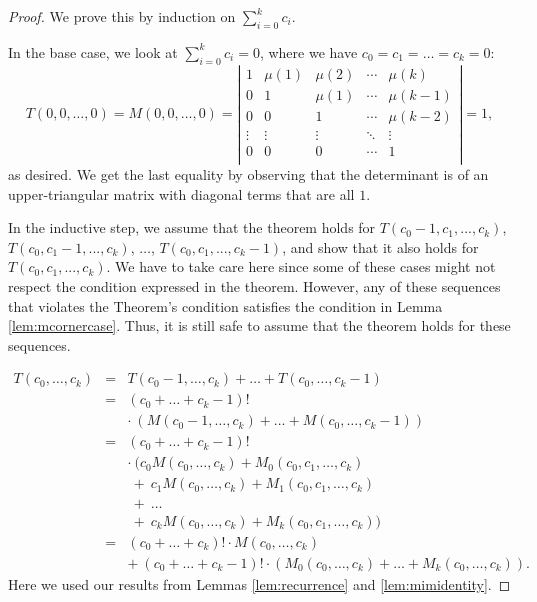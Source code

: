 \documentclass[12pt]{amsart}
\newcommand{\ifact}{\mu}
\newcommand{\M}{M}
\begin{document}
\begin{proof}
We prove this by induction on $\sum_{i=0}^{k}{c_i}$.

In the base case, we look at $\sum_{i=0}^{k}{c_i} = 0$, where we have $c_0 = c_1 = \dots = c_k = 0$:
$$
T(0,0,\dots,0) = \M(0,0,\dots,0)=\left|
\begin{matrix}
1 & \ifact(1) & \ifact(2) & \cdots & \ifact(k) \\
0 & 1 & \ifact(1) & \cdots & \ifact(k-1) \\
0 & 0 & 1 & \cdots & \ifact(k-2) \\
\vdots & \vdots & \vdots & \ddots & \vdots \\
0 & 0 & 0 & \cdots & 1 \\
\end{matrix} \right| = 1,
$$
as desired. We get the last equality by observing that the determinant is of an upper-triangular matrix with diagonal terms that are all $1$.

In the inductive step, we assume that the theorem holds for $T(c_0-1,c_1,...,c_k)$, $T(c_0,c_1-1,...,c_k)$, $\dots$, $T(c_0,c_1,...,c_k-1)$, and show that it also holds for $T(c_0,c_1,...,c_k)$. We have to take care here since some of these cases might not respect the condition expressed in the theorem. However, any of these sequences that violates the Theorem's condition satisfies the condition in Lemma \ref{lem:mcornercase}. Thus, it is still safe to assume that the theorem holds for these sequences.

$$\begin{array}{ccl}
T(c_0, \dots, c_k) & = & T(c_0-1, \dots, c_k) + \dots + T(c_0, \dots, c_k-1) \\
& = & (c_0 + \dots + c_k-1)! \\
& & \cdot\ ( \M(c_0-1, \dots, c_k) + \dots + \M(c_0, \dots, c_k-1)) \\
& = & (c_0 + \dots + c_k-1)! \\
& & \cdot\ ( c_0 \M(c_0, \dots, c_k) + \M_0(c_0, c_1, \dots, c_k) \\
& & \ +\ c_1 \M(c_0, \dots, c_k) + \M_1(c_0, c_1, \dots, c_k) \\
& & \ +\ \dots \\
& & \ +\ c_k \M(c_0, \dots, c_k) + \M_k(c_0, c_1, \dots, c_k) ) \\
& = & (c_0 + \dots + c_k)! \cdot \M(c_0,\dots,c_k) \\
& & +\ (c_0+\dots+c_k-1)! \cdot (\M_0(c_0,\dots,c_k) + \dots + \M_k(c_0,\dots,c_k)).
\end{array}$$
Here we used our results from Lemmas \ref{lem:recurrence} and \ref{lem:mimidentity}.


\end{proof}
\end{document}
